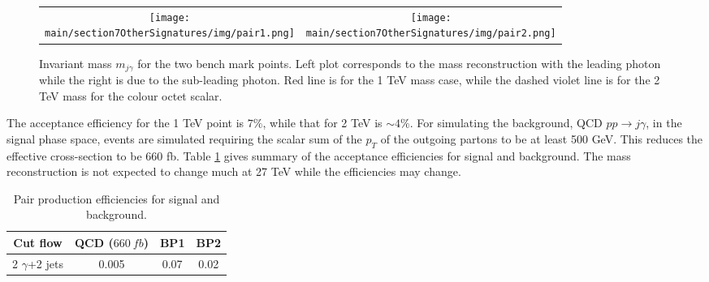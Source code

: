    \begin{figure}[t!]
   	\begin{center}
   		\begin{tabular}{cc}
   		\texttt{[image: \\main/section7OtherSignatures/img/pair1.png]}&	\texttt{[image: \\main/section7OtherSignatures/img/pair2.png]}
   			
   		\end{tabular}
   	\end{center}
   	\caption{Invariant mass $m_{j\gamma}$ for the two bench mark points. Left plot corresponds to the mass reconstruction with the 
	leading photon while the right is due to the sub-leading photon. Red line is for the 1 TeV mass case, while the dashed violet line is 
	for the 2 TeV mass for the colour octet scalar.}
   	\protect\label{fig:pair}
   \end{figure}
The acceptance efficiency for the 1 TeV point is $7\%$, while that for 2 TeV is $\sim 4\%$. For simulating the  background, 
QCD $pp\to j\gamma$, in the signal phase space, events are simulated requiring the scalar sum of the $p_T$ of the outgoing partons to be at least 500 GeV. This reduces the effective cross-section to be $660$ fb. Table \ref{tab:pair} gives summary of the acceptance efficiencies for signal and background. The mass reconstruction is not expected to change much at 27 TeV while the efficiencies may change. \\
 \begin{table}[h!]
 	\begin{center}
 		\begin{tabular}{|c|c|c|c|} 
 			\hline
 			
 			Cut flow           & QCD ($660~fb$)  & BP1&  BP2\\ \hline
 			\hline
 			
 			2 $\gamma$+2 jets         &0.005&0.07&0.02\\ \hline   
 		\end{tabular}
 		\caption{\label{tab:pair} Pair production efficiencies for signal and background. } 
 	\end{center}
 \end{table}


